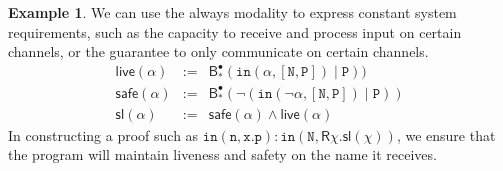 \documentclass[conference]{IEEEtran}
\theoremstyle{definition}
\newtheorem{example}[theorem]{Example}
\newcommand{\msf}[1]{\mathsf{#1}}
\newcommand{\mtt}[1]{\mathtt{#1}}
\newcommand{\ttx}{\mtt{x}}
\newcommand{\N}{\mtt{N}}
\newcommand{\PP}{\mtt{P}}
\newcommand{\tti}{\mtt{in}}
\newcommand{\n}{\mtt{n}}
\newcommand{\p}{\mtt{p}}
\begin{document}
\begin{example}
    We can use the always modality to express constant system requirements, such as the capacity to receive and process input on certain channels, or the guarantee to only communicate on certain channels.
    \[\begin{array}{lcr}
        \msf{live}(\alpha) & := & \msf{B}_*^\bullet(\tti(\alpha,[\N,\PP]) \;|\; \PP))\\
        \msf{safe}(\alpha) & := & \msf{B}_*^\bullet(\neg(\tti(\neg\alpha,[\N,\PP]) \;|\; \PP))\\
        \msf{sl}(\alpha) & := & \msf{safe}(\alpha)\land \msf{live}(\alpha)
    \end{array}\]
In constructing a proof such as $\tti(\n,\ttx.\p):\tti(\N,\msf{R}\chi.\msf{sl}(\chi))$, we ensure that the program will maintain liveness and safety on the name it receives.
\end{example}
\end{document}
